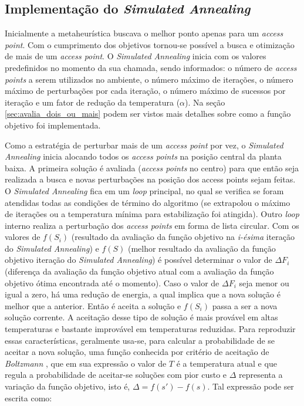 \documentclass[
	12pt,				%
	twoside,			%
	a4paper,			%
	english,			%
	french,				%
	spanish,			%
	brazil				%
	]{abntex2}
\begin{document}
\subsection{\texorpdfstring{Implementação do \emph{Simulated
Annealing}}{Implementação do Simulated Annealing}}\label{implementauxe7uxe3o-do-simulated-annealing}

Inicialmente a metaheurística buscava o melhor ponto apenas para um
\emph{access point}. Com o cumprimento dos objetivos tornou-se possível
a busca e otimização de mais de um \emph{access point}. O
\emph{Simulated Annealing} inicia com os valores predefinidos no momento
da sua chamada, sendo informados: o número de \emph{access points} a
serem utilizados no ambiente, o número máximo de iterações, o número
máximo de perturbações por cada iteração, o número máximo de sucessos
por iteração e um fator de redução da temperatura (\(\alpha\)). Na seção
\ref{sec:avalia_dois_ou_mais} podem ser vistos mais detalhes sobre como
a função objetivo foi implementada.

Como a estratégia de perturbar mais de um \emph{access point} por vez, o
\emph{Simulated Annealing} inicia alocando todos os \emph{access points}
na posição central da planta baixa. A primeira solução é avaliada
(\emph{access points} no centro) para que então seja realizada a busca e
novas perturbações na posição dos access points sejam feitas. O
\emph{Simulated Annealing} fica em um \emph{loop} principal, no qual se
verifica se foram atendidas todas as condições de término do algoritmo
(se extrapolou o máximo de iterações ou a temperatura mínima para
estabilização foi atingida). Outro \emph{loop} interno realiza a
perturbação dos \emph{access points} em forma de lista circular. Com os
valores de \(f(S_{i})\) (resultado da avaliação da função objetivo na
\emph{i-ésima} iteração do \emph{Simulated Annealing}) e \(f(S)\)
(melhor resultado da avaliação da função objetivo iteração do
\emph{Simulated Annealing}) é possível determinar o valor de
\(\Delta F_{i}\) (diferença da avaliação da função objetivo atual com a
avaliação da função objetivo ótima encontrada até o momento). Caso o
valor de \(\Delta F_{i}\) seja menor ou igual a zero, há uma redução de
energia, a qual implica que a nova solução é melhor que a anterior.
Então é aceita a solução e \(f(S_{i})\) passa a ser a nova solução
corrente. A aceitação desse tipo de solução é mais provável em altas
temperaturas e bastante improvável em temperaturas reduzidas. Para
reproduzir essas características, geralmente usa-se, para calcular a
probabilidade de se aceitar a nova solução, uma função conhecida por
critério de aceitação de \emph{Boltzmann} \cite{AARTS}, que em sua
expressão o valor de \(T\) é a temperatura atual e que regula a
probabilidade de aceitar-se soluções com pior custo e \(\Delta\)
representa a variação da função objetivo, isto é,
\(\Delta = f(s') - f(s)\). Tal expressão pode ser escrita como:
\end{document}

